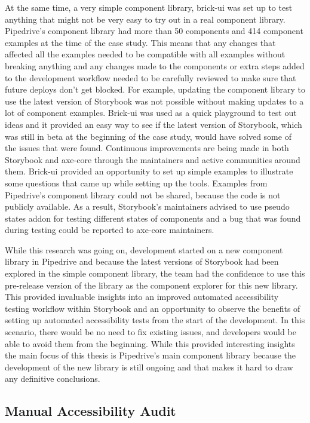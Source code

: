\documentclass{master_thesis}
\begin{document}
At the same time, a very simple component library, brick-ui was set up to test anything that might not be very easy to try out in a real component library. Pipedrive's component library had more than 50 components and 414 component examples at the time of the case study. This means that any changes that affected all the examples needed to be compatible with all examples without breaking anything and any changes made to the components or extra steps added to the development workflow needed to be carefully reviewed to make sure that future deploys don't get blocked. For example, updating the component library to use the latest version of Storybook was not possible without making updates to a lot of component examples. Brick-ui was used as a quick playground to test out ideas and it provided an easy way to see if the latest version of Storybook, which was still in beta at the beginning of the case study, would have solved some of the issues that were found. Continuous improvements are being made in both  Storybook and axe-core through the maintainers and active communities around them. Brick-ui provided an opportunity to set up simple examples to illustrate some questions that came up while setting up the tools. Examples from Pipedrive's component library could not be shared, because the code is not publicly available. As a result, Storybook's maintainers advised to use pseudo states addon for testing different states of components and a bug that was found during testing could be reported to axe-core maintainers.

While this research was going on, development started on a new component library in Pipedrive and because the latest versions of Storybook had been explored in the simple component library, the team had the confidence to use this pre-release version of the library as the component explorer for this new library. This provided invaluable insights into an improved automated accessibility testing workflow within Storybook and an opportunity to observe the benefits of setting up automated accessibility tests from the start of the development. In this scenario, there would be no need to fix existing issues, and developers would be able to avoid them from the beginning. While this provided interesting insights the main focus of this thesis is Pipedrive's main component library because the development of the new library is still ongoing and that makes it hard to draw any definitive conclusions.

\subsection{Manual Accessibility Audit}
\end{document}
